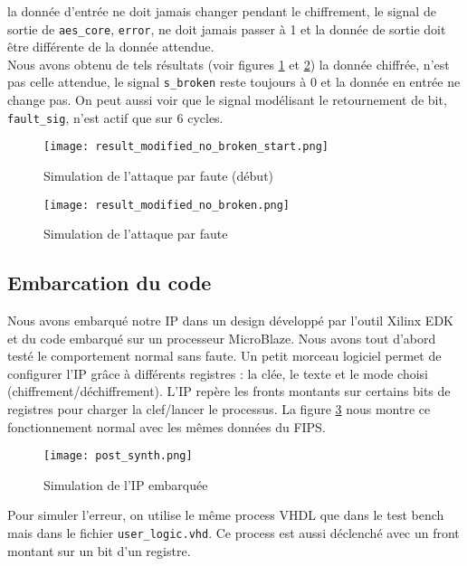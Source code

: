 la donnée d'entrée ne doit jamais changer pendant le chiffrement, le signal
de sortie de \texttt{aes\_core}, \texttt{error}, ne doit jamais passer à 1 et
la donnée de sortie doit être différente de la donnée attendue. \\
Nous avons obtenu de tels résultats (voir figures \ref{modified_start} et
\ref{modified}) la donnée chiffrée, n'est pas celle attendue, le signal
\texttt{s\_broken} reste toujours à 0 et la donnée en entrée ne change pas. On
peut
aussi voir que le signal modélisant le retournement de bit, \texttt{fault\_sig},
n'est actif que sur 6 cycles.
\begin{figure}[htbp]
	\begin{center}
		\texttt{[image: result\_modified\_no\_broken\_start.png]}
		\caption{Simulation de l'attaque par faute (début)}
		\label{modified_start}
	\end{center}
\end{figure}
\begin{figure}[htbp]
	\begin{center}
	\texttt{[image: result\_modified\_no\_broken.png]}
	\caption{Simulation de l'attaque par faute}
	\label{modified}
	\end{center}
\end{figure}

\subsection{Embarcation du code}
Nous avons embarqué notre IP dans un design développé par l'outil Xilinx EDK
et du code embarqué sur un processeur MicroBlaze. Nous avons tout d'abord testé
le comportement normal sans faute. Un petit morceau logiciel permet de configurer
l'IP grâce à différents registres : la clée, le texte et le mode
choisi (chiffrement/déchiffrement). L'IP repère les fronts montants sur certains
bits de registres pour charger la clef/lancer le processus. La figure \ref{post}
nous montre ce fonctionnement normal avec les mêmes données du FIPS. \\
\begin{figure}[htbp]
	\begin{center}
	\texttt{[image: post\_synth.png]}
	\caption{Simulation de l'IP embarquée}
	\label{post}
	\end{center}
\end{figure}
Pour simuler l'erreur, on utilise le même process VHDL que dans le test bench
mais dans le fichier \texttt{user\_logic.vhd}. Ce process est aussi déclenché
avec un front montant sur un bit d'un registre.

